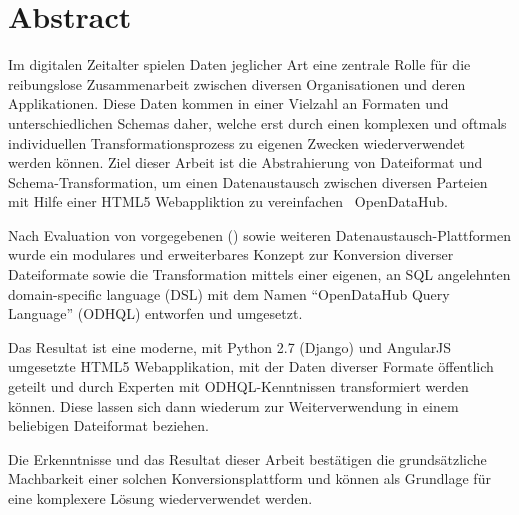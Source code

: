 \begin{comment}
2.1.2 Abstract
Ein Abstract ist eine rein textuelle kurze Zusammenfassung der Arbeit. Der Abstract ist für die Recherche in grossen Dokumentensammlungen geeignet. Er umfasst nie mehr als eine Seite, typisch sogar nur etwa 200 Worte (etwa 20 Zeilen).
Der Begriff ‚Kurzfassung’ ist zuwenig genau definiert; er soll wenn möglich vermieden werden.
\end{comment}


{}
\chapter*{Abstract}

Im digitalen Zeitalter spielen Daten jeglicher Art eine zentrale Rolle für die reibungslose Zusammenarbeit zwischen diversen Organisationen und deren Applikationen. Diese Daten kommen in einer Vielzahl an Formaten und unterschiedlichen Schemas daher, welche erst durch einen komplexen und oftmals individuellen Transformationsprozess zu eigenen Zwecken wiederverwendet werden können. Ziel dieser Arbeit ist die Abstrahierung von Dateiformat und Schema-Transformation, um einen Datenaustausch zwischen diversen Parteien mit Hilfe einer HTML5 Webappliktion zu vereinfachen \textendash\ OpenDataHub.

\medskip
Nach Evaluation von vorgegebenen () sowie weiteren Datenaustausch-Plattformen wurde ein modulares und erweiterbares Konzept zur Konversion diverser Dateiformate sowie die Transformation mittels einer eigenen, an SQL angelehnten domain-specific language (DSL) mit dem Namen ``OpenDataHub Query Language'' (ODHQL) entworfen und umgesetzt.

\medskip
Das Resultat ist eine moderne, mit Python 2.7 (Django) und AngularJS umgesetzte HTML5 Webapplikation, mit der Daten diverser Formate öffentlich geteilt und durch Experten mit ODHQL-Kenntnissen transformiert werden können. Diese lassen sich dann wiederum zur Weiterverwendung in einem beliebigen Dateiformat beziehen.

\medskip
Die Erkenntnisse und das Resultat dieser Arbeit bestätigen die grundsätzliche Machbarkeit einer solchen Konversionsplattform und können als Grundlage für eine komplexere Lösung wiederverwendet werden.


\glsresetall